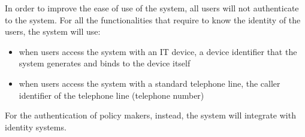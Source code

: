 \documentclass[../../main.tex]{subfiles}
\begin{document}
In order to improve the ease of use of the system, all users will not authenticate to the system. For all the functionalities that require to know the identity of the users, the system will use:


\begin{itemize}
    \item when users access the system with an IT device, a device identifier that the system generates and binds to the device itself
    \item when users access the system with a standard telephone line, the caller identifier of the telephone line (telephone number)
\end{itemize}

For the authentication of policy makers, instead, the system will integrate with identity systems.
\end{document}
